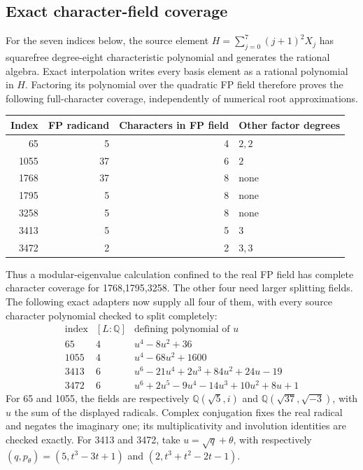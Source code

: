 \subsection{Exact character-field coverage}

For the seven indices below, the source element
$H=\sum_{j=0}^7(j+1)^2X_j$ has squarefree degree-eight characteristic
polynomial and generates the rational algebra. Exact interpolation writes
every basis element as a rational polynomial in $H$. Factoring its
polynomial over the quadratic FP field therefore proves the following
full-character coverage, independently of numerical root approximations.

\begin{center}
\begin{tabular}{r|r|r|l}
Index & FP radicand & Characters in FP field & Other factor degrees\\\hline
65 & 5 & 4 & $2,2$\\
1055 & 37 & 6 & $2$\\
1768 & 37 & 8 & none\\
1795 & 5 & 8 & none\\
3258 & 5 & 8 & none\\
3413 & 5 & 5 & $3$\\
3472 & 2 & 2 & $3,3$
\end{tabular}
\end{center}

Thus a modular-eigenvalue calculation confined to the real FP field has
complete character coverage for 1768,1795,3258. The other four need larger
splitting fields. The following exact adapters now supply all four of
them, with every source character polynomial checked to split completely:
\[
\begin{array}{c|c|l}
\text{index}&[L:\mathbb Q]&\text{defining polynomial of }u\\\hline
65&4&u^4-8u^2+36\\
1055&4&u^4-68u^2+1600\\
3413&6&u^6-21u^4+2u^3+84u^2+24u-19\\
3472&6&u^6+2u^5-9u^4-14u^3+10u^2+8u+1
\end{array}
\]
For 65 and 1055, the fields are respectively
$\mathbb Q(\sqrt5,i)$ and $\mathbb Q(\sqrt{37},\sqrt{-3})$, with
$u$ the sum of the displayed radicals. Complex conjugation fixes the
real radical and negates the imaginary one; its multiplicativity and
involution identities are checked exactly. For 3413 and 3472, take
$u=\sqrt q+\theta$, with respectively
$(q,p_\theta)=(5,t^3-3t+1)$ and $(2,t^3+t^2-2t-1)$.

